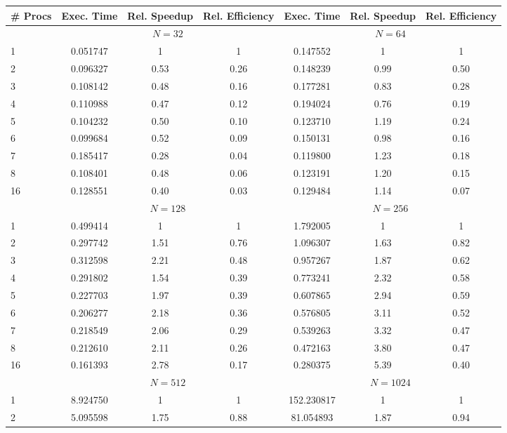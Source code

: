 \documentclass[11pt,a4paper,onecolumn]{article}
\begin{document}
\begin{table}[H]
  \centering
  \begin{tabular}{l | c | c | c | c | c | c}
    \# Procs & Exec. Time & Rel. Speedup & Rel. Efficiency & Exec. Time & Rel. Speedup & Rel. Efficiency\\
    \hline
    \multicolumn{1}{c}{} & \multicolumn{3}{c}{$N = 32$} & \multicolumn{3}{c}{$N = 64$} \\
    \hline
    1 & 0.051747 & 1 & 1 & 0.147552 & 1 & 1\\ 
    2 & 0.096327 & 0.53 & 0.26 & 0.148239 & 0.99 & 0.50\\
    3 & 0.108142 & 0.48 & 0.16 & 0.177281 & 0.83 & 0.28\\
    4 & 0.110988 & 0.47 & 0.12 & 0.194024 & 0.76 & 0.19\\
    5 & 0.104232 & 0.50 & 0.10 & 0.123710 & 1.19 & 0.24\\
    6 & 0.099684 & 0.52 & 0.09 & 0.150131 & 0.98 & 0.16\\
    7 & 0.185417 & 0.28 & 0.04 & 0.119800 & 1.23 & 0.18\\
    8 & 0.108401 & 0.48 & 0.06 & 0.123191 & 1.20 & 0.15\\
    16 & 0.128551 & 0.40 & 0.03 & 0.129484 & 1.14 & 0.07\\
    \hline
    \multicolumn{1}{c}{} & \multicolumn{3}{c}{$N = 128$} & \multicolumn{3}{c}{$N = 256$} \\
    \hline
    1 & 0.499414 & 1 & 1 & 1.792005 & 1 & 1\\
    2 & 0.297742 & 1.51 & 0.76 & 1.096307 & 1.63 & 0.82\\
    3 & 0.312598 & 2.21 & 0.48 & 0.957267 & 1.87 & 0.62\\
    4 & 0.291802 & 1.54 & 0.39 & 0.773241 & 2.32 & 0.58\\
    5 & 0.227703 & 1.97 & 0.39 & 0.607865 & 2.94 & 0.59\\
    6 & 0.206277 & 2.18 & 0.36 & 0.576805 & 3.11 & 0.52\\
    7 & 0.218549 & 2.06 & 0.29 & 0.539263 & 3.32 & 0.47\\ 
    8 & 0.212610 & 2.11 & 0.26 & 0.472163 & 3.80 & 0.47\\
    16 & 0.161393 & 2.78 & 0.17 & 0.280375 & 5.39 & 0.40\\
    \hline
    \multicolumn{1}{c}{} & \multicolumn{3}{c}{$N = 512$} & \multicolumn{3}{c}{$N = 1024$} \\
    \hline
    1 & 8.924750 & 1 & 1 & 152.230817 & 1 & 1\\ 
    2 & 5.095598 & 1.75 & 0.88 & 81.054893 & 1.87 & 0.94\\ 

\end{tabular}
\end{table}
\end{document}
